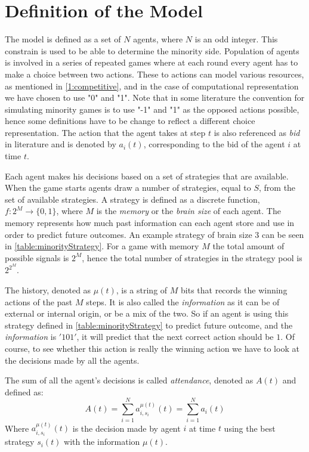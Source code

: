 \section{Definition of the Model}
\label{minority:definition}

The model is defined as a set of $N$ agents, where $N$ is an odd integer.
This constrain is used to be able to determine the minority side.
Population of agents is involved in a series of repeated games where at each round every agent has to make a choice between two actions.
These to actions can model various resources, as mentioned in \ref{1:competitive}, and in the case of computational representation we have chosen to use "0" and "1".
Note that in some literature the convention for simulating minority games is to use "-1" and "1" as the opposed actions possible, hence some definitions have to be change to reflect a different choice representation.
The action that the agent takes at step $t$ is also referenced as \textit{bid} in literature and is denoted by $a_i(t)$, corresponding to the bid of the agent $i$ at time $t$.

Each agent makes his decisions based on a set of strategies that are available. When the game starts agents draw a number of strategies, equal to $S$, from the set of available strategies.
A strategy is defined as a discrete function, $f:2^M\to\{0,1\}$, where $M$ is the \textit{memory} or the \textit{brain size} of each agent.
The memory represents how much past information can each agent store and use in order to predict future outcomes.
An example strategy of brain size $3$ can be seen in \ref{table:minorityStrategy}.
For a game with memory $M$ the total amount of possible signals is $2^M$, hence the total number of strategies in the strategy pool is $2^{2^M}$.

The history, denoted as $\mu(t)$, is a string of $M$ bits that records the winning actions of the past $M$ steps.
It is also called the \textit{information} as it can be of external or internal origin, or be a mix of the two.
So if an agent is using this strategy defined in \ref{table:minorityStrategy} to predict future outcome, and the \textit{information} is $'101'$, it will predict that the next correct action should be $1$.
Of course, to see whether this action is really the winning action we have to look at the decisions made by all the agents.

The sum of all the agent's decisions is called \textit{attendance}, denoted as $A(t)$ and defined as:
\begin{displaymath}
A(t)=\sum_{i=1}^N a_{i,s_i}^{\mu(t)}(t) = \sum_{i=1}^N a_i(t)
\end{displaymath}
Where $a_{i,s_i}^{\mu(t)}(t)$ is the decision made by agent $i$ at time $t$ using the best strategy $s_i(t)$ with the information $\mu(t)$.

